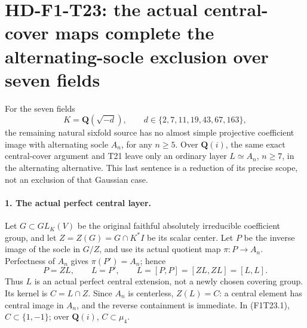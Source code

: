 \section[HD-F1-T23: complete alternating-socle exclusion over seven fields]{HD-F1-T23: the actual central-cover maps complete the alternating-socle exclusion over seven fields}
\label{sec:f1-alternating-socle-completion}

For the seven fields
\[
 K=\mathbf Q(\sqrt{-d}),\qquad
 d\in\{2,7,11,19,43,67,163\},
 \tag{F1T23.1}
\]
the remaining natural sixfold source has no almost
simple projective coefficient image with alternating
socle \(A_n\), for any \(n\ge5\).
Over \(\mathbf Q(i)\), the same exact central-cover
argument and T21 leave only an ordinary layer
\(L\simeq A_n\), \(n\ge7\), in the alternating
alternative. This last sentence is a reduction of its
precise scope, not an exclusion of that Gaussian case.

\paragraph{1. The actual perfect central layer.}
Let \(G\subset GL_K(V)\) be the original faithful
absolutely irreducible coefficient group, and let
\(Z=Z(G)=G\cap K^*I\) be its scalar center.
Let \(P\) be the inverse image of the socle in
\(G/Z\), and use its actual quotient map
\(\pi:P\to A_n\). Perfectness of \(A_n\)
gives \(\pi(P')=A_n\); hence
\[
 P=ZL,\qquad L=P',\qquad
 L=[P,P]=[ZL,ZL]=[L,L].
 \tag{F1T23.2}
\]
Thus \(L\) is an actual perfect central extension,
not a newly chosen covering group. Its kernel is
\(C=L\cap Z\). Since \(A_n\) is centerless,
\(Z(L)=C\): a central element has central image in
\(A_n\), and the reverse containment is immediate.
In (F1T23.1), \(C\subset\{1,-1\}\); over
\(\mathbf Q(i)\), \(C\subset\mu_4\).

